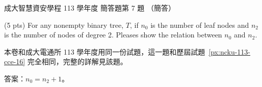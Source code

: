 \begin{pastexam}[label={px:ncku-113-isec-16}]{成大智慧資安學程 113 學年度 簡答題第 7 題}
（簡答）

(5 pts) For any nonempty binary tree, $T$, if $n_0$ is the number of leaf nodes and $n_2$ is the
number of nodes of degree 2. Pleases show the relation between $n_0$ and $n_2$.
\end{pastexam}

\begin{pastsoln}
本卷和成大電通所 113 學年度用同一份試題，這一題和歷屆試題~\ref{px:ncku-113-cce-16} 完全相同，完整的詳解見該題。

答案：$n_0 = n_2 + 1$。
\end{pastsoln}

